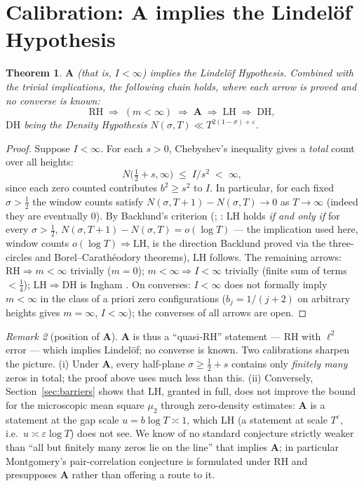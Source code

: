 \documentclass[11pt]{amsart}
\theoremstyle{plain}
\newtheorem{theorem}{Theorem}[section]
\theoremstyle{definition}
\theoremstyle{remark}
\newtheorem{remark}[theorem]{Remark}
\newcommand{\RH}{\mathrm{RH}}
\newcommand{\LH}{\mathrm{LH}}
\renewcommand{\DH}{\mathrm{DH}}
\newcommand{\Aax}{\mathbf{A}}
\begin{document}
\section{Calibration: $\Aax$ implies the Lindel\"of Hypothesis}\label{sec:lindelof}

\begin{theorem}\label{thm:lindelof}
$\Aax$ (that is, $I<\infty$) implies the Lindel\"of Hypothesis. Combined with the trivial implications, the following chain holds, where each arrow is proved and no converse is known:
\[
\RH\;\Longrightarrow\;(m<\infty)\;\Longrightarrow\;\Aax\;\Longrightarrow\;\LH\;\Longrightarrow\;\DH ,
\]
$\DH$ being the Density Hypothesis $N(\sigma,T)\ll T^{2(1-\sigma)+\varepsilon}$.
\end{theorem}

\begin{proof}
Suppose $I<\infty$. For each $s>0$, Chebyshev's inequality gives a \emph{total} count over all heights:
\[
N\bigl(\tfrac12+s,\infty\bigr)\;\le\;I/s^2\;<\;\infty ,
\]
since each zero counted contributes $b^2\ge s^2$ to $I$. In particular, for each fixed $\sigma>\tfrac12$ the window counts satisfy $N(\sigma,T+1)-N(\sigma,T)\to0$ as $T\to\infty$ (indeed they are eventually $0$). By Backlund's criterion (\cite{Backlund1918}; \cite[\S13.5]{Titchmarsh1986}: $\LH$ holds \emph{if and only if} for every $\sigma>\tfrac12$, $N(\sigma,T+1)-N(\sigma,T)=o(\log T)$ --- the implication used here, window counts $o(\log T)\Rightarrow\LH$, is the direction Backlund proved via the three-circles and Borel--Carath\'eodory theorems), $\LH$ follows. The remaining arrows: $\RH\Rightarrow m<\infty$ trivially ($m=0$); $m<\infty\Rightarrow I<\infty$ trivially (finite sum of terms $<\tfrac14$); $\LH\Rightarrow\DH$ is Ingham \cite{Ingham1940}. On converses: $I<\infty$ does not formally imply $m<\infty$ in the class of a priori zero configurations ($b_j=1/(j+2)$ on arbitrary heights gives $m=\infty$, $I<\infty$); the converses of all arrows are open.
\end{proof}

\begin{remark}[position of $\Aax$]\label{rem:position}
$\Aax$ is thus a ``quasi-$\RH$'' statement --- $\RH$ with $\ell^2$ error --- which implies Lindel\"of; no converse is known. Two calibrations sharpen the picture. (i) Under $\Aax$, every half-plane $\sigma\ge\tfrac12+s$ contains only \emph{finitely many} zeros in total; the proof above uses much less than this. (ii) Conversely, Section~\ref{sec:barriers} shows that $\LH$, granted in full, does not improve the bound for the microscopic mean square $\mu_2$ through zero-density estimates: $\Aax$ is a statement at the gap scale $u=b\log T\asymp1$, which $\LH$ (a statement at scale $T^\varepsilon$, i.e.\ $u\asymp\varepsilon\log T$) does not see. We know of no standard conjecture strictly weaker than ``all but finitely many zeros lie on the line'' that implies $\Aax$; in particular Montgomery's pair-correlation conjecture \cite{Montgomery1973} is formulated under $\RH$ and presupposes $\Aax$ rather than offering a route to it.
\end{remark}
\end{document}
